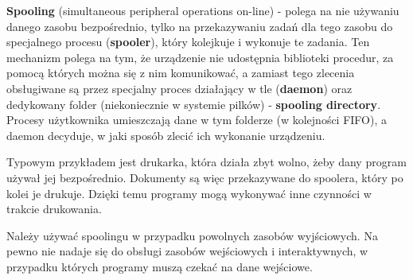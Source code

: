\textbf{Spooling} (simultaneous peripheral operations on-line) - polega na nie używaniu danego zasobu bezpośrednio, tylko na przekazywaniu zadań dla tego zasobu do specjalnego procesu (\textbf{spooler}), który kolejkuje i wykonuje te zadania. Ten mechanizm polega na tym, że urządzenie nie udostępnia biblioteki procedur, za pomocą których można się z nim komunikować, a zamiast tego zlecenia obsługiwane są przez specjalny proces działający w tle (\textbf{daemon}) oraz dedykowany folder (niekoniecznie w systemie pilków) - \textbf{spooling directory}. Procesy użytkownika umieszczają dane w tym folderze (w kolejności FIFO), a daemon decyduje, w jaki sposób zlecić ich wykonanie urządzeniu.

Typowym przykładem jest drukarka, która działa zbyt wolno, żeby dany program używał jej bezpośrednio. Dokumenty są więc przekazywane do spoolera, który po kolei je drukuje. Dzięki temu programy mogą wykonywać inne czynności w trakcie drukowania.

Należy używać spoolingu w przypadku powolnych zasobów wyjściowych. Na pewno nie nadaje się do obsługi zasobów wejściowych i interaktywnych, w przypadku których programy muszą czekać na dane wejściowe.